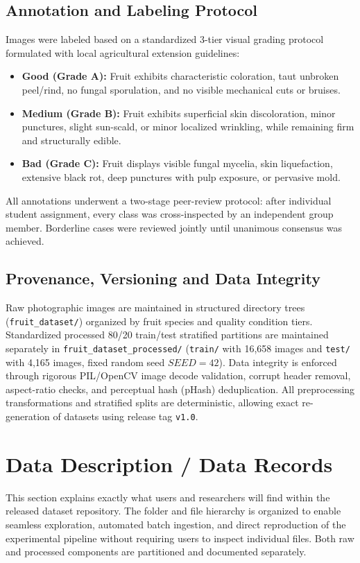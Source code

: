 \documentclass[11pt,a4paper]{article}
\begin{document}
\subsection{Annotation and Labeling Protocol}
Images were labeled based on a standardized 3-tier visual grading protocol formulated with local agricultural extension guidelines:
\begin{itemize}
    \item \textbf{Good (Grade A):} Fruit exhibits characteristic coloration, taut unbroken peel/rind, no fungal sporulation, and no visible mechanical cuts or bruises.
    \item \textbf{Medium (Grade B):} Fruit exhibits superficial skin discoloration, minor punctures, slight sun-scald, or minor localized wrinkling, while remaining firm and structurally edible.
    \item \textbf{Bad (Grade C):} Fruit displays visible fungal mycelia, skin liquefaction, extensive black rot, deep punctures with pulp exposure, or pervasive mold.
\end{itemize}
All annotations underwent a two-stage peer-review protocol: after individual student assignment, every class was cross-inspected by an independent group member. Borderline cases were reviewed jointly until unanimous consensus was achieved.

\subsection{Provenance, Versioning and Data Integrity}
Raw photographic images are maintained in structured directory trees (\texttt{fruit\_dataset/}) organized by fruit species and quality condition tiers. Standardized processed 80/20 train/test stratified partitions are maintained separately in \texttt{fruit\_dataset\_processed/} (\texttt{train/} with 16,658 images and \texttt{test/} with 4,165 images, fixed random seed $SEED = 42$). Data integrity is enforced through rigorous PIL/OpenCV image decode validation, corrupt header removal, aspect-ratio checks, and perceptual hash (pHash) deduplication. All preprocessing transformations and stratified splits are deterministic, allowing exact re-generation of datasets using release tag \texttt{v1.0}.

\section{Data Description / Data Records}
This section explains exactly what users and researchers will find within the released dataset repository. The folder and file hierarchy is organized to enable seamless exploration, automated batch ingestion, and direct reproduction of the experimental pipeline without requiring users to inspect individual files. Both raw and processed components are partitioned and documented separately.
\end{document}

